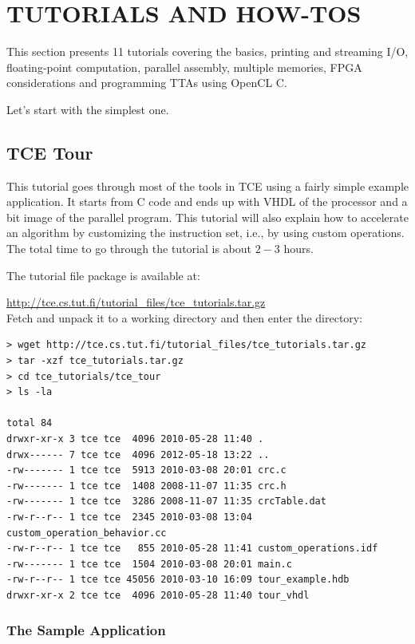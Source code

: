 \documentclass[twoside]{tceusermanual}
\begin{document}
\chapter{TUTORIALS AND HOW-TOS}
\label{chapter:tutorials}

This section presents 11 tutorials covering the basics, printing and
streaming I/O, floating-point computation, parallel assembly, multiple
memories, FPGA considerations and programming TTAs using OpenCL C.

Let's start with the simplest one.

\section{TCE Tour}
\label{sec:tcetour}

This tutorial goes through most of the tools in TCE using a fairly simple
example application. It starts from C code and ends up with VHDL of the
processor and a bit image of the parallel program. This tutorial will also
explain how to accelerate an algorithm by customizing the instruction
set, i.e., by using custom operations. The total time to go through
the tutorial is about $2-3$ hours.

The tutorial file package is available at:

\url{http://tce.cs.tut.fi/tutorial_files/tce_tutorials.tar.gz}\\

Fetch and unpack it to a working directory and then enter the directory:

\begin{verbatim}
> wget http://tce.cs.tut.fi/tutorial_files/tce_tutorials.tar.gz
> tar -xzf tce_tutorials.tar.gz
> cd tce_tutorials/tce_tour
> ls -la

total 84
drwxr-xr-x 3 tce tce  4096 2010-05-28 11:40 .
drwx------ 7 tce tce  4096 2012-05-18 13:22 ..
-rw------- 1 tce tce  5913 2010-03-08 20:01 crc.c
-rw------- 1 tce tce  1408 2008-11-07 11:35 crc.h
-rw------- 1 tce tce  3286 2008-11-07 11:35 crcTable.dat
-rw-r--r-- 1 tce tce  2345 2010-03-08 13:04 custom_operation_behavior.cc
-rw-r--r-- 1 tce tce   855 2010-05-28 11:41 custom_operations.idf
-rw------- 1 tce tce  1504 2010-03-08 20:01 main.c
-rw-r--r-- 1 tce tce 45056 2010-03-10 16:09 tour_example.hdb
drwxr-xr-x 2 tce tce  4096 2010-05-28 11:40 tour_vhdl
\end{verbatim}


\subsection{The Sample Application}
\end{document}
